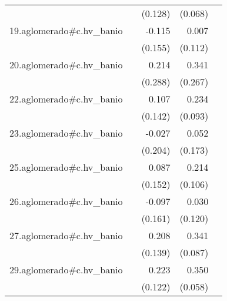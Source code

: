 {\begin{longtable}{l*{4}{D{.}{.}{-1}}}
            &                     &     (0.128)         &     (0.068)         &                     \\
\addlinespace
19.aglomerado#c.hv\_banio&                     &      -0.115         &       0.007         &                     \\
            &                     &     (0.155)         &     (0.112)         &                     \\
\addlinespace
20.aglomerado#c.hv\_banio&                     &       0.214         &       0.341         &                     \\
            &                     &     (0.288)         &     (0.267)         &                     \\
\addlinespace
22.aglomerado#c.hv\_banio&                     &       0.107         &       0.234\sym{*}  &                     \\
            &                     &     (0.142)         &     (0.093)         &                     \\
\addlinespace
23.aglomerado#c.hv\_banio&                     &      -0.027         &       0.052         &                     \\
            &                     &     (0.204)         &     (0.173)         &                     \\
\addlinespace
25.aglomerado#c.hv\_banio&                     &       0.087         &       0.214\sym{*}  &                     \\
            &                     &     (0.152)         &     (0.106)         &                     \\
\addlinespace
26.aglomerado#c.hv\_banio&                     &      -0.097         &       0.030         &                     \\
            &                     &     (0.161)         &     (0.120)         &                     \\
\addlinespace
27.aglomerado#c.hv\_banio&                     &       0.208         &       0.341\sym{***}&                     \\
            &                     &     (0.139)         &     (0.087)         &                     \\
\addlinespace
29.aglomerado#c.hv\_banio&                     &       0.223         &       0.350\sym{***}&                     \\
            &                     &     (0.122)         &     (0.058)         &                     \\

\end{longtable}}
